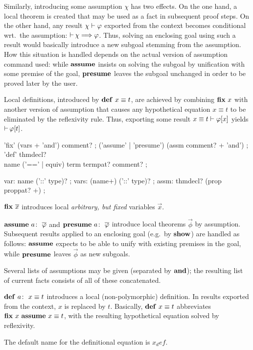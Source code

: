 Similarly, introducing some assumption $\chi$ has two effects.  On the one
hand, a local theorem is created that may be used as a fact in subsequent
proof steps.  On the other hand, any result $\chi \mathrel{\vdash} \varphi$ exported from the
context becomes conditional wrt.\ the assumption: $\mathop{\mathrel{\vdash}}\nolimits \chi \Longrightarrow \varphi$.
Thus, solving an enclosing goal using such a result would basically introduce
a new subgoal stemming from the assumption.  How this situation is handled
depends on the actual version of assumption command used: while ${\mathord{\mathbf{assume}}}$
insists on solving the subgoal by unification with some premise of the goal,
${\mathord{\mathbf{presume}}}$ leaves the subgoal unchanged in order to be proved later by the
user.

Local definitions, introduced by $\DEF{}{x \equiv t}$, are achieved by
combining ${\mathord{\mathbf{fix}}}~x$ with another version of assumption that causes any
hypothetical equation $x \equiv t$ to be eliminated by the reflexivity rule.
Thus, exporting some result $x \equiv t \mathrel{\vdash} \varphi[x]$ yields $\mathop{\mathrel{\vdash}}\nolimits \varphi[t]$.


\begin{rail}
  'fix' (vars + 'and') comment?
  ;
  ('assume' | 'presume') (assm comment? + 'and')
  ;
  'def' thmdecl? \\ name ('==' | equiv) term termpat? comment?
  ;

  var: name ('::' type)?
  ;
  vars: (name+) ('::' type)?
  ;
  assm: thmdecl? (prop proppat? +)
  ;
\end{rail}

\begin{descr}
\item [${\mathord{\mathbf{fix}}}~\overline{x}$] introduces local \emph{arbitrary, but fixed} variables
  $\vec x$.
\item [$\ASSUME{a}{\vec\phi}$ and $\PRESUME{a}{\vec\phi}$] introduce local
  theorems $\vec\phi$ by assumption.  Subsequent results applied to an
  enclosing goal (e.g.\ by ${\mathord{\mathbf{show}}}$) are handled as follows: ${\mathord{\mathbf{assume}}}$
  expects to be able to unify with existing premises in the goal, while
  ${\mathord{\mathbf{presume}}}$ leaves $\vec\phi$ as new subgoals.
  
  Several lists of assumptions may be given (separated by
  ${\mathord{\mathbf{and}}}$); the resulting list of current facts consists of all of
  these concatenated.
\item [$\DEF{a}{x \equiv t}$] introduces a local (non-polymorphic) definition.
  In results exported from the context, $x$ is replaced by $t$.  Basically,
  $\DEF{}{x \equiv t}$ abbreviates $\FIX{x}~\ASSUME{}{x \equiv t}$, with the
  resulting hypothetical equation solved by reflexivity.
  
  The default name for the definitional equation is $x_def$.
\end{descr}

